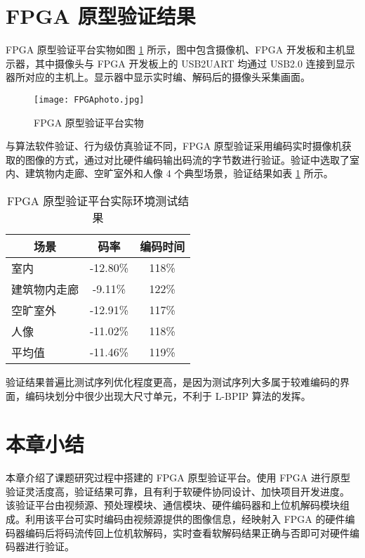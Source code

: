 \section{FPGA 原型验证结果}
FPGA 原型验证平台实物如图 \ref{fig:FPGAphoto} 所示，图中包含摄像机、FPGA 开发板和主机显示器，其中摄像头与 FPGA 开发板上的 USB2UART 均通过 USB2.0 连接到显示器所对应的主机上。显示器中显示实时编、解码后的摄像头采集画面。
\begin{figure}[hbt]
    \centering
    \texttt{[image: FPGAphoto.jpg]}
    \caption{FPGA 原型验证平台实物}
    \label{fig:FPGAphoto}
\end{figure}

与算法软件验证、行为级仿真验证不同，FPGA 原型验证采用编码实时摄像机获取的图像的方式，通过对比硬件编码输出码流的字节数进行验证。验证中选取了室内、建筑物内走廊、空旷室外和人像 4 个典型场景，验证结果如表 \ref{tab:FPGADemoTestTab} 所示。
\begin{table}[hbt]
    \centering
    \caption{FPGA 原型验证平台实际环境测试结果}
    \label{tab:FPGADemoTestTab}
    \begin{tabular}{@{}lcc@{}}
        \toprule
        \multicolumn{1}{c}{场景} & 码率     & 编码时间 \\ \midrule
        室内                     & -12.80\% & 118\%    \\
        建筑物内走廊             & -9.11\%  & 122\%    \\
        空旷室外                 & -12.91\% & 117\%    \\
        人像                     & -11.02\% & 118\%    \\ \midrule
        平均值                   & -11.46\% & 119\%    \\ \bottomrule
    \end{tabular}
\end{table}

验证结果普遍比测试序列优化程度更高，是因为测试序列大多属于较难编码的界面，编码块划分中很少出现大尺寸单元，不利于 L-BPIP 算法的发挥。

\section{本章小结}
本章介绍了课题研究过程中搭建的 FPGA 原型验证平台。使用 FPGA 进行原型验证灵活度高，验证结果可靠，且有利于软硬件协同设计、加快项目开发进度。
该验证平台由视频源、预处理模块、通信模块、硬件编码器和上位机解码模块组成。利用该平台可实时编码由视频源提供的图像信息，经映射入 FPGA 的硬件编码器编码后将码流传回上位机软解码，实时查看软解码结果正确与否即可对硬件编码器进行验证。